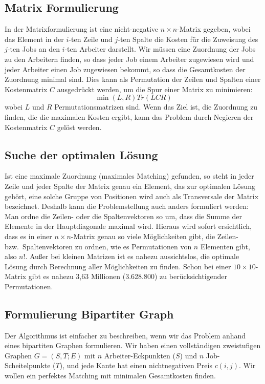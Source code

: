 \subsection{Matrix Formulierung
\label{munkres:subsection:bonorum}}
In der Matrixformulierung ist eine nicht-negative $n\times n$-Matrix
gegeben, wobei das Element in der $i$-ten Zeile und $j$-ten Spalte
die Kosten für die Zuweisung des $j$-ten Jobs an den $i$-ten Arbeiter
darstellt.
Wir müssen eine Zuordnung der Jobs zu den Arbeitern finden, so dass
jeder Job einem Arbeiter zugewiesen wird und jeder Arbeiter einen
Job zugewiesen bekommt, so dass die Gesamtkosten der Zuordnung
minimal sind.
Dies kann als Permutation der Zeilen und Spalten einer Kostenmatrix
$C$ ausgedrückt werden, um die Spur einer Matrix zu minimieren:
\begin{equation}
\min(L,R)Tr (LCR)
\end{equation}
wobei $L$ und $R$ Permutationsmatrizen sind.
Wenn das Ziel ist, die Zuordnung zu finden, die die maximalen Kosten
ergibt, kann das Problem durch Negieren der Kostenmatrix $C$ gelöst
werden.

\subsection{Suche der optimalen Lösung
\label{munkres:subsection:bonorum}}
Ist eine maximale Zuordnung (maximales Matching) gefunden, so steht
in jeder Zeile und jeder Spalte der Matrix genau ein Element, das
zur optimalen Lösung gehört, eine solche Gruppe von Positionen wird
auch als Transversale der Matrix bezeichnet.
Deshalb kann die Problemstellung auch anders formuliert werden: Man
ordne die Zeilen- oder die Spaltenvektoren so um, dass die Summe
der Elemente in der Hauptdiagonale maximal wird.
Hieraus wird sofort ersichtlich, dass es in einer 
$n\times n$-Matrix genau so viele Möglichkeiten gibt, die Zeilen-
bzw.~Spaltenvektoren zu ordnen, wie es Permutationen von $n$ Elementen
gibt, also $n!$.
Außer bei kleinen Matrizen ist es nahezu aussichtslos, die optimale
Lösung durch Berechnung aller Möglichkeiten zu finden.
Schon bei einer $10\times 10$-Matrix gibt es nahezu 3,63 Millionen (3.628.800)
zu berücksichtigender Permutationen.

\subsection{Formulierung Bipartiter Graph
\label{munkres:subsection:bonorum}}
Der Algorithmus ist einfacher zu beschreiben, wenn wir das Problem
anhand eines bipartiten Graphen formulieren.
Wir haben einen vollständigen zweistufigen Graphen $G=(S,T;E)$ mit
$n$ Arbeiter-Eckpunkten ($S$) und $n$ Job-Scheitelpunkte ($T$), und
jede Kante hat einen nichtnegativen Preis $c(i,j)$.
Wir wollen ein perfektes Matching mit minimalen Gesamtkosten finden.


